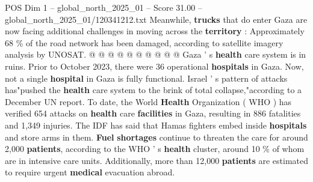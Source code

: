 \begin{textsample}{POS Dim 1 – global\_north\_2025\_01 – Score 31.00 – global\_north\_2025\_01/120341212.txt}
Meanwhile, \textbf{trucks} that do enter Gaza are now facing additional challenges in moving across the \textbf{territory} : Approximately 68 \% of the road network has been damaged, according to satellite imagery analysis by UNOSAT. @ @ @ @ @ @ @ @ @ @ Gaza ' s \textbf{health} care system is in ruins.
Prior to October 2023, there were 36 operational \textbf{hospitals} in Gaza.
Now, not a single \textbf{hospital} in Gaza is fully functional.
Israel ' s pattern of attacks has"pushed the \textbf{health} care system to the brink of total collapse,"according to a December UN report.
To date, the World \textbf{Health} Organization ( WHO ) has verified 654 attacks on \textbf{health} care \textbf{facilities} in Gaza, resulting in 886 fatalities and 1,349 injuries.
The IDF has said that Hamas fighters embed inside \textbf{hospitals} and store arms in them. \textbf{Fuel} \textbf{shortages} continue to threaten the care for around 2,000 \textbf{patients}, according to the WHO ' s \textbf{health} cluster, around 10 \% of whom are in intensive care units.
Additionally, more than 12,000 \textbf{patients} are estimated to require urgent \textbf{medical} evacuation abroad.

\end{textsample}
